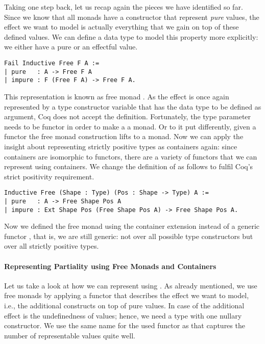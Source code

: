 Taking one step back, let us recap again the pieces we have identified
so far.
Since we know that all monads have a constructor that represent
\emph{pure} values, the effect we want to model is actually
everything that we gain on top of these defined values.
We can define a data type to model this property more explicitly: we
either have a pure or an effectful value.

\begin{verbatim}
Fail Inductive Free F A :=
| pure   : A -> Free F A
| impure : F (Free F A) -> Free F A.
\end{verbatim}

This representation is known as free monad \citep{swierstra2008data}.
As the effect is once again represented by a type constructor
variable  that has the data type to be defined as argument,
Coq does not accept the definition.
Fortunately, the type parameter  needs to be functor in order
to make a  a monad.
Or to it put differently, given a functor  the free monad
construction lifts  to a monad.
Now we can apply the insight about representing strictly positive
types as containers again: since containers are isomorphic to
functors, there are a variety of functors that we can represent using
containers.
We change the definition of  as follows to fulfil Coq's
strict positivity requirement.

\begin{verbatim}
Inductive Free (Shape : Type) (Pos : Shape -> Type) A :=
| pure   : A -> Free Shape Pos A
| impure : Ext Shape Pos (Free Shape Pos A) -> Free Shape Pos A.
\end{verbatim}

Now we defined the free monad using the container extension instead of
a generic functor , that is, we are still generic: not
over all possible type constructors but over all strictly positive
types.

\paragraph{Representing Partiality using Free Monads and Containers}

Let us take a look at how we can represent  using
.
As already mentioned, we use free monads by applying a functor
 that describes the effect we want to model, i.e., the
additional constructs on top of pure values.
In case of  the additional effect is the undefinedness
of values; hence, we need a type with one nullary constructor.
We use the same name for the used functor as \citet{swierstra2008data}
that captures the number of representable values quite well.

